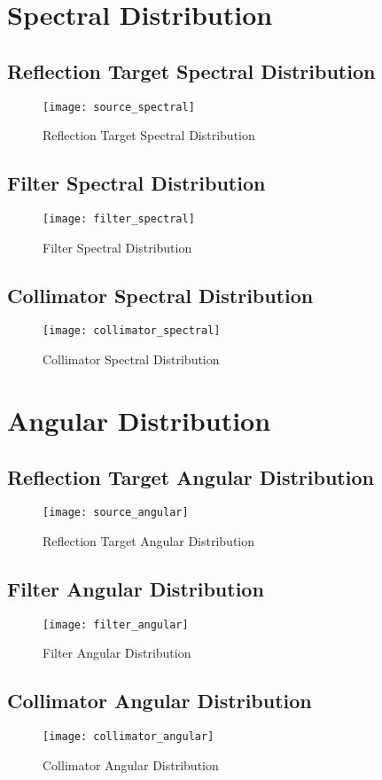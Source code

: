 \documentclass[12pt]{article}
\begin{document}
\section{Spectral Distribution}

\subsection{Reflection Target Spectral Distribution}
\begin{figure}[H]
\centering
\texttt{[image: source\_spectral]}
\caption{Reflection Target Spectral Distribution}
\label{fig:source_spectral}
\end{figure}

\subsection{Filter Spectral Distribution}
\begin{figure}[H]
\centering
\texttt{[image: filter\_spectral]}
\caption{Filter Spectral Distribution}
\label{fig:filter_spectral}
\end{figure}

\subsection{Collimator Spectral Distribution}
\begin{figure}[H]
\centering
\texttt{[image: collimator\_spectral]}
\caption{Collimator Spectral Distribution}
\label{fig:source_spectral}
\end{figure}


\section{Angular Distribution}

\subsection{Reflection Target Angular Distribution}
\begin{figure}[H]
\centering
\texttt{[image: source\_angular]}
\caption{Reflection Target Angular Distribution}
\label{fig:source_angular}
\end{figure}

\subsection{Filter Angular Distribution}
\begin{figure}[H]
\centering
\texttt{[image: filter\_angular]}
\caption{Filter Angular Distribution}
\label{fig:filter_angular}
\end{figure}

\subsection{Collimator Angular Distribution}
\begin{figure}[H]
\centering
\texttt{[image: collimator\_angular]}
\caption{Collimator Angular Distribution}
\label{fig:collimator_angular}
\end{figure}
\end{document}

